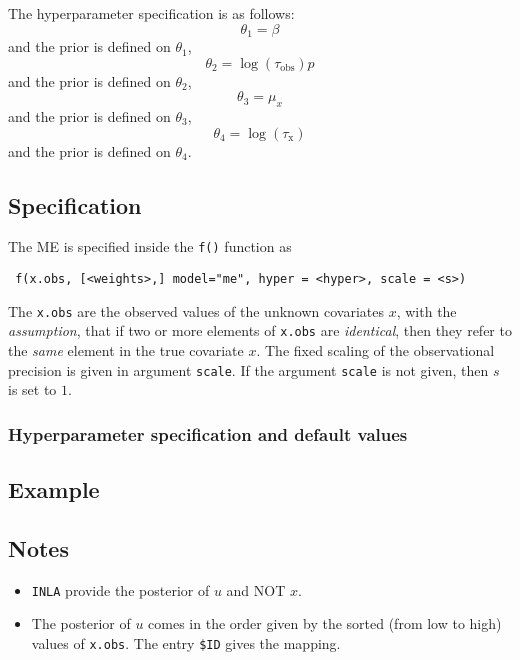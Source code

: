 \documentclass[a4paper,11pt]{article}
\begin{document}
The hyperparameter specification is as follows:
\begin{displaymath}
    \theta_{1} = \beta
\end{displaymath}
and the prior is defined on $\theta_{1}$,
\begin{displaymath}
    \theta_{2} = \log(\tau_{\text{obs}})
p\end{displaymath}
and the prior is defined on $\theta_{2}$,
\begin{displaymath}
    \theta_{3} = \mu_{x}
\end{displaymath}
and the prior is defined on $\theta_{3}$,
\begin{displaymath}
    \theta_{4} = \log(\tau_{\text{x}})
\end{displaymath}
and the prior is defined on $\theta_{4}$.


\subsection*{Specification}

The ME is specified inside the {\tt f()}
function as
\begin{verbatim}
 f(x.obs, [<weights>,] model="me", hyper = <hyper>, scale = <s>)
\end{verbatim}

The \texttt{x.obs} are the observed values of the unknown covariates
$x$, with the \emph{assumption}, that if two or more elements of
\texttt{x.obs} are \emph{identical}, then they refer to the
\emph{same} element in the true covariate $x$. The fixed scaling of
the observational precision is given in argument \texttt{scale}. If
the argument \texttt{scale} is not given, then $s$ is set to $1$.


\subsubsection*{Hyperparameter specification and default values}


\subsection*{Example}



\subsection*{Notes}

\begin{itemize}
\item \texttt{INLA} provide the posterior of $u$ and NOT $x$.
\item The posterior of $u$ comes in the order given by the sorted
    (from low to high) values of \texttt{x.obs}. The entry \verb|$ID|
    gives the mapping.
\end{itemize}
\end{document}
